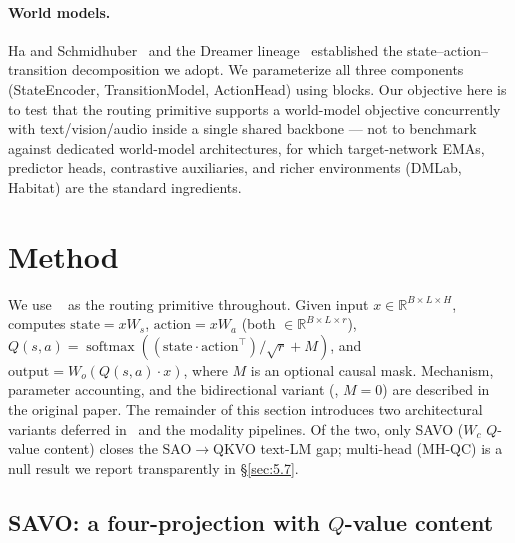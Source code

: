 \paragraph{World models.} Ha and Schmidhuber~\cite{ref14} and the Dreamer lineage~\cite{ref15} established the state--action--transition decomposition we adopt. We parameterize all three components (StateEncoder, TransitionModel, ActionHead) using \QCBi{} blocks. Our objective here is to test that the routing primitive supports a world-model objective concurrently with text/vision/audio inside a single shared backbone --- not to benchmark against dedicated world-model architectures, for which target-network EMAs, predictor heads, contrastive auxiliaries, and richer environments (DMLab, Habitat) are the standard ingredients.

\section{Method}\label{sec:3}

We use \QC{}~\cite{ref1} as the routing primitive throughout. Given input $x \in \mathbb{R}^{B\times L\times H}$, \QC{} computes $\text{state} = xW_s$, $\text{action} = xW_a$ (both $\in \mathbb{R}^{B\times L\times r}$), $Q(s,a) = \operatorname{softmax}((\text{state}\cdot\text{action}^{\top})/\sqrt{r} + M)$, and $\text{output} = W_o(Q(s,a)\cdot x)$, where $M$ is an optional causal mask. Mechanism, parameter accounting, and the bidirectional variant (\QCBi{}, $M=0$) are described in the original paper. The remainder of this section introduces two architectural variants deferred in~\cite{ref1} and the modality pipelines. Of the two, only SAVO ($W_c$ $Q$-value content) closes the SAO$\to$QKVO text-LM gap; multi-head \QC{} (MH-QC) is a null result we report transparently in \S\ref{sec:5.7}.

\subsection{SAVO: a four-projection \QC{} with $Q$-value content}\label{sec:3.1}

